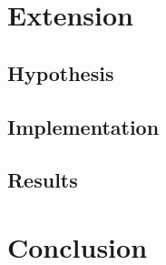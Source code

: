 \documentclass[11pt,a4paper]{article}
\begin{document}
\section{Extension}
\subsection{Hypothesis}
\subsection{Implementation}
\subsection{Results}
\section{Conclusion}

\printbibliography
\end{document}

